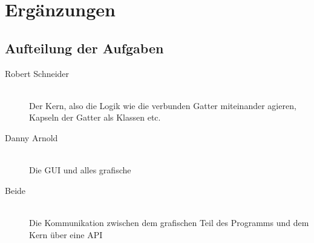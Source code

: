 
\section{Ergänzungen}


\subsection{Aufteilung der Aufgaben}

\begin{description}
	\item[Robert Schneider] ~ \\ Der Kern, also die Logik wie die verbunden Gatter miteinander agieren, Kapseln der Gatter als Klassen etc.
	\item[Danny Arnold] ~ \\ Die GUI und alles grafische
	\item[Beide] ~ \\ Die Kommunikation zwischen dem grafischen Teil des Programms und dem Kern über eine API
\end{description}